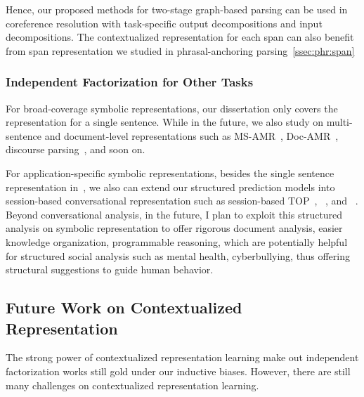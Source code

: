 Hence, our proposed methods for two-stage graph-based parsing can be
used in coreference resolution with task-specific output
decompositions and input decompositions. The contextualized
representation for each span can also benefit from span representation
we studied in phrasal-anchoring parsing~\autoref{ssec:phr:span}

\subsubsection{Independent Factorization for Other Tasks}
\label{sssec:future:other-tasks}

For broad-coverage symbolic representations, our dissertation only
covers the representation for a single sentence. While in the future,
we also study on multi-sentence and document-level representations
such as MS-AMR~\cite{ogorman-etal-2018-amr},
Doc-AMR~\cite{naseem-etal-2022-docamr}, discourse
parsing~\cite{carlson-etal-2001-building}, and soon on.

For application-specific symbolic representations, besides the single
sentence representation
in~\cite[TOP,][]{gupta-etal-2018-semantic-parsing}, we also can extend
our structured prediction models into session-based conversational
representation such as session-based
TOP~\cite{aghajanyan2020conversational},
~\cite[TreeDST,][]{cheng2020conversational}, and
~\cite[Dataflow,][]{andreas2020task}.  Beyond conversational analysis,
in the future, I plan to exploit this structured analysis on symbolic
representation to offer rigorous document analysis, easier knowledge
organization, programmable reasoning, which are potentially helpful
for structured social analysis such as mental health, cyberbullying,
thus offering structural suggestions to guide human behavior.

\subsection{Future Work on Contextualized Representation}
\label{ssec:future:contextual-rep}
The strong power of
contextualized representation learning make out independent
factorization works still gold under our inductive biases. However,
there are still many challenges on contextualized representation
learning.

